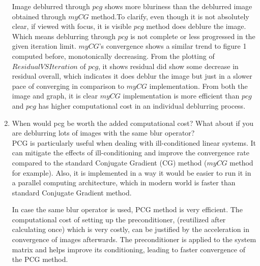 \documentclass[unicode,11pt,a4paper,oneside,numbers=endperiod,openany]{scrartcl}
\begin{document}
\begin{enumerate}
Image deblurred through ${pcg}$ shows more bluriness than the deblurred image obtained through ${myCG}$ method.To clarify, even though it is not absolutely clear, if viewed with focus, it is visible ${pcg}$ method does deblure the image. Which means deblurring through ${pcg}$ is not complete or less progressed in the given iteration limit. ${myCG}$'s convergence shows a similar trend to figure 1 computed before, monotonically decreasing. From the plotting of ${ResidualVSIteration}$ of ${pcg}$, it shows residual did show some decrease in residual overall, which indicates it does deblur the image but just in a slower pace of converging in comparison to ${myCG}$ implementation. From both the image and graph, it is clear ${myCG}$ implementation is more efficient than ${pcg}$ and ${pcg}$ has higher computational cost in an individual deblurring process.

\item When would pcg be worth the added computational cost? What about if you are deblurring lots of images with
the same blur operator? \\

PCG is particularly useful when dealing with ill-conditioned linear systems. It can mitigate the effects of ill-conditioning and improve the convergence rate compared to the standard Conjugate Gradient (CG) method (${myCG}$ method for example). Also, it is implemented in a way it would be easier to run it in a parallel computing architecture, which in modern world is faster than standard Conjugate Gradient method.

In case the same blur operator is used, PCG method is very efficient. The computational cost of setting up the preconditioner, (reutilized after calculating once) which is very costly, can be justified by the acceleration in convergence of images afterwards. The preconditioner is applied to the system matrix and helps improve its conditioning, leading to faster convergence of the PCG method.


\end{enumerate}
\end{document}
